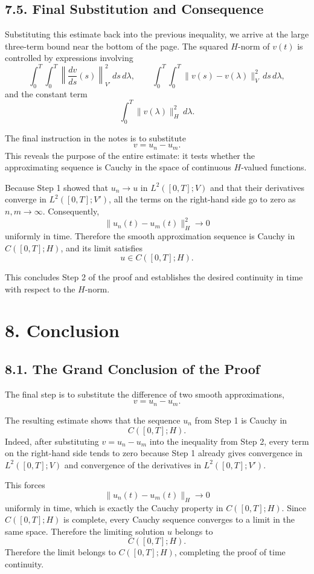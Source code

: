 \documentclass[11pt]{article}
\theoremstyle{definition}
\theoremstyle{remark}
\begin{document}
\subsection*{7.5. Final Substitution and Consequence}
Substituting this estimate back into the previous inequality, we arrive at the large three-term bound near the bottom of the page. The squared \(H\)-norm of \(v(t)\) is controlled by expressions involving
\[
\int_0^T\int_0^T \left\|\frac{dv}{ds}(s)\right\|_{V'}^2\,ds\,d\lambda,
\qquad
\int_0^T\int_0^T \|v(s)-v(\lambda)\|_V^2\,ds\,d\lambda,
\]
and the constant term
\[
\int_0^T \|v(\lambda)\|_H^2\,d\lambda.
\]

The final instruction in the notes is to substitute
\[
v=u_n-u_m.
\]
This reveals the purpose of the entire estimate: it tests whether the approximating sequence is Cauchy in the space of continuous \(H\)-valued functions.

Because Step 1 showed that \(u_n\to u\) in \(L^2([0,T];V)\) and that their derivatives converge in \(L^2([0,T];V')\), all the terms on the right-hand side go to zero as \(n,m\to\infty\). Consequently,
\[
\|u_n(t)-u_m(t)\|_H^2\to 0
\]
uniformly in time. Therefore the smooth approximation sequence is Cauchy in \(C([0,T];H)\), and its limit satisfies
\[
u\in C([0,T];H).
\]

This concludes Step 2 of the proof and establishes the desired continuity in time with respect to the \(H\)-norm.

\section*{8. Conclusion}

\subsection*{8.1. The Grand Conclusion of the Proof}
The final step is to substitute the difference of two smooth approximations,
\[
v=u_n-u_m.
\]

The resulting estimate shows that the sequence \(u_n\) from Step 1 is Cauchy in
\[
C([0,T];H).
\]
Indeed, after substituting \(v=u_n-u_m\) into the inequality from Step 2, every term on the right-hand side tends to zero because Step 1 already gives convergence in \(L^2([0,T];V)\) and convergence of the derivatives in \(L^2([0,T];V')\).

This forces
\[
\|u_n(t)-u_m(t)\|_H\to 0
\]
uniformly in time, which is exactly the Cauchy property in \(C([0,T];H)\). Since \(C([0,T];H)\) is complete, every Cauchy sequence converges to a limit in the same space. Therefore the limiting solution \(u\) belongs to
\[
C([0,T];H).
\]
Therefore the limit belongs to \(C([0,T];H)\), completing the proof of time continuity.
\end{document}
